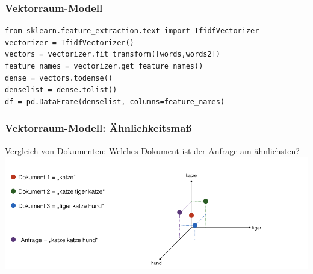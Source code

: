     
\begin{frame}[fragile]
\frametitle{Vektorraum-Modell}
    
    \begin{verbatim}
from sklearn.feature_extraction.text import TfidfVectorizer
vectorizer = TfidfVectorizer()
vectors = vectorizer.fit_transform([words,words2])
feature_names = vectorizer.get_feature_names()
dense = vectors.todense()
denselist = dense.tolist()
df = pd.DataFrame(denselist, columns=feature_names)
    \end{verbatim}
\end{frame}
     
    
\begin{frame}
    \frametitle{Vektorraum-Modell: Ähnlichkeitsmaß}
    Vergleich von Dokumenten:
    Welches Dokument ist der Anfrage am ähnlichsten?
    \vspace{0.3cm}
    \includegraphics[width=\linewidth]{fig8/vector_space}
    
\end{frame}
    
    
